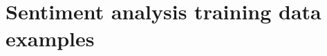 \clearpage




\clearpage

\appendixpage
\appendix

\section{Sentiment analysis training data examples}\label{apx:sentences_ex}

